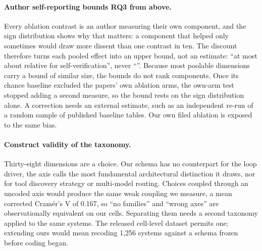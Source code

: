 \paragraph{Author self-reporting bounds RQ3 from above.}
\label{subsec:selfreport}
Every ablation contrast is an author measuring their own component, and the sign distribution shows why
that matters: a component that helped only sometimes would draw more dissent than one contrast in ten.
The discount therefore turns each pooled effect into an upper bound, not an estimate: ``at most about
\rqSVDiscounted{} relative for self-verification'', never ``\rqSVDiscounted''. Because most poolable
dimensions carry a bound of similar size, the bounds do not rank components. Once its chance baseline excluded the papers'
own ablation arms, the own-arm test stopped adding a second measure, so the bound rests on the sign
distribution alone. A correction needs an external estimate, such as an independent re-run of a random
sample of published baseline tables. Our own filed ablation is exposed to the same bias.

\paragraph{Construct validity of the taxonomy.}
\label{subsec:construct}
Thirty-eight dimensions are a choice. Our schema has no counterpart for the loop driver, the axis
\citet{rombaut2026insidescaffold} calls the most fundamental architectural distinction it draws, nor for
tool discovery strategy or multi-model routing. Choices coupled through an uncoded axis would produce the
same weak coupling we measure, a mean corrected Cram\'er's V of 0.167, so ``no families'' and ``wrong
axes'' are observationally equivalent on our cells. Separating them needs a second taxonomy applied to the
same systems. The released cell-level dataset permits one; extending ours would mean recoding 1,256
systems against a schema frozen before coding began.

